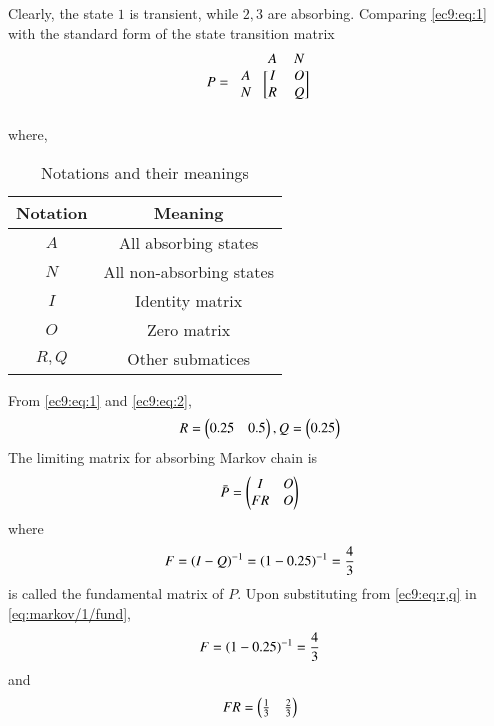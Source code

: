 %  
Clearly, the state $1$ is transient, while $2,3$ are absorbing. Comparing   \eqref{ec9:eq:1} with the standard form of 
the state transition matrix 
\begin{align}
\label{ec9:eq:2}
P=\begin{blockarray}{ccc}
&A & N \\
\begin{block}{c[cc]}
  A & I & O  \\
  N & R & Q \\
\end{block}
\end{blockarray}
\end{align}
where,
\begin{table}[ht!]
\centering
\caption{Notations and their meanings}
\label{ec9:table:2}
\begin{tabular}{|c|c|}
    \hline
    Notation & Meaning \\
    \hline
    $A$ & All absorbing states\\[1ex]
    \hline
    $N$ & All non-absorbing states\\[1ex]
    \hline
    $I$ & Identity matrix\\[1ex]
    \hline
    $O$ & Zero matrix\\[1ex]
    \hline
    $R,Q$ & Other submatices\\[1ex]
    \hline
\end{tabular}
\end{table}
From   \eqref{ec9:eq:1} and  \eqref{ec9:eq:2},
\begin{align}
\label{ec9:eq:r,q}
    R=\begin{pmatrix}
    0.25 & 0.5\\
    \end{pmatrix},
    Q=\begin{pmatrix}
    0.25\\
    \end{pmatrix}
\end{align}
The limiting matrix for absorbing Markov chain is
\begin{align}
\bar P=\begin{pmatrix}
    I & O\\
    FR & O\\
    \end{pmatrix}
    \label{eq:markov/1/limit}
\end{align}
where
\begin{align}
F=\left(I-Q\right)^{-1} = \left(1-0.25\right)^{-1} = \frac{4}{3}
\label{eq:markov/1/fund}
\end{align}
is called the fundamental matrix of $P$. 
Upon substituting from \eqref{ec9:eq:r,q} in \eqref{eq:markov/1/fund},
\begin{align}
  F=\left(1-0.25\right)^{-1} = \frac{4}{3}
  \end{align}
  and
  \begin{align}
    FR=\begin{pmatrix}\frac{1}{3} & \frac{2}{3}\end{pmatrix}
    \end{align}
